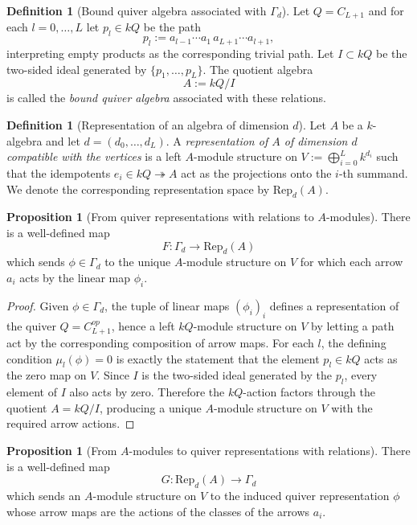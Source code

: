 \documentclass{article}
\theoremstyle{definition}
\newtheorem{proposition}[theorem]{Proposition}
\newtheorem{definition}[theorem]{Definition}
\begin{document}
\begin{definition}[Bound quiver algebra associated with $\Gamma_d$]
Let $Q=C_{L+1}$ and for each $l=0,\ldots,L$ let $p_l\in kQ$ be the path
\[
 p_l := a_{l-1}\cdots a_1\,a_{L+1}\cdots a_{l+1},
\]
interpreting empty products as the corresponding trivial path.
Let $I\subset kQ$ be the two-sided ideal generated by $\{p_1,\ldots,p_{L}\}$.
The quotient algebra
\[
A:=kQ/I
\]
is called the \emph{bound quiver algebra} associated with these relations.
\end{definition}

\begin{definition}[Representation of an algebra of dimension $d$]
Let $A$ be a $k$-algebra and let $d=(d_0,\ldots,d_L)$.
A \emph{representation of $A$ of dimension $d$ compatible with the vertices} is a left $A$-module structure on
$V:=\bigoplus_{i=0}^L k^{d_i}$ such that the idempotents $e_i\in kQ\twoheadrightarrow A$ act as the projections onto the $i$-th summand.
We denote the corresponding representation space by $\mathrm{Rep}_d(A)$.
\end{definition}

\begin{proposition}[From quiver representations with relations to $A$-modules]
There is a well-defined map
\[
F:\Gamma_d\to \mathrm{Rep}_d(A)
\]
which sends $\phi\in\Gamma_d$ to the unique $A$-module structure on $V$ for which each arrow $a_i$ acts by the linear map $\phi_i$.
\end{proposition}

\begin{proof}
Given $\phi\in\Gamma_d$, the tuple of linear maps $(\phi_i)_i$ defines a representation of the quiver $Q=C_{L+1}^{op}$, hence a left $kQ$-module structure on $V$ by letting a path act by the corresponding composition of arrow maps.
For each $l$, the defining condition $\mu_l(\phi)=0$ is exactly the statement that the element $p_l\in kQ$ acts as the zero map on $V$.
Since $I$ is the two-sided ideal generated by the $p_l$, every element of $I$ also acts by zero.
Therefore the $kQ$-action factors through the quotient $A=kQ/I$, producing a unique $A$-module structure on $V$ with the required arrow actions.
\end{proof}

\begin{proposition}[From $A$-modules to quiver representations with relations]
There is a well-defined map
\[
G:\mathrm{Rep}_d(A)\to \Gamma_d
\]
which sends an $A$-module structure on $V$ to the induced quiver representation $\phi$ whose arrow maps are the actions of the classes of the arrows $a_i$.
\end{proposition}
\end{document}
